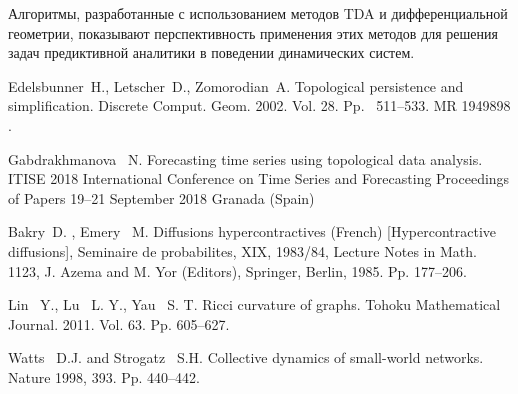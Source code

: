  Алгоритмы, разработанные с использованием методов TDA и дифференциальной геометрии, показывают перспективность применения этих методов для решения задач предиктивной аналитики в поведении динамических систем.





%

\begin{thebibliography}{9} %
 Edelsbunner~H., Letscher~D., Zomorodian~A. Topological persistence and simplification. Discrete Comput. Geom. 2002. Vol. 28. Pp.~ 511--533. MR 1949898 .


 Gabdrakhmanova~ N.  Forecasting time series using topological data analysis. ITISE 2018 International Conference on Time Series and Forecasting Proceedings of Papers 19--21 September 2018 Granada (Spain)

 Bakry~D. , Emery~ M.  Diffusions hypercontractives (French) [Hypercontractive diffusions], Seminaire de probabilites, XIX, 1983/84, Lecture Notes in Math. 1123, J. Azema and M. Yor (Editors), Springer, Berlin, 1985. Pp. 177--206.

 Lin~ Y., Lu~ L. Y., Yau~ S. T. Ricci curvature of graphs. Tohoku Mathematical Journal. 2011. Vol. 63. Pp. 605--627.   

 Watts ~D.J. and Strogatz~ S.H. Collective dynamics of small-world networks. Nature 1998, 393. Pp. 440--442.
\end{thebibliography}




%
